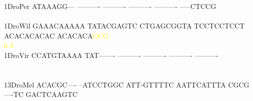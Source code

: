 \documentclass[11pt,twoside,reqno,a4paper]{article}
\begin{document}
{1\hspace*{3\charwidth}DroPer	ATAAAGG---	----------	----------	----------	----------	-----CTCCG	\\
\hspace*{4\charwidth}\hspace*{7\charwidth}\hspace*{1\charwidth}\hspace*{1\charwidth}\hspace*{1\charwidth}\hspace*{1\charwidth}\hspace*{1\charwidth}\hspace*{1\charwidth}\\
1\hspace*{3\charwidth}DroWil	GAAACAAAAA	TATACGAGTC	CTGAGCGGTA	TCCTCCTCCT	ACACACACAC	ACACACA\textcolor{Yellow}{G}\textcolor{Yellow}{C}\textcolor{Yellow}{G}	\\
\hspace*{4\charwidth}\hspace*{7\charwidth}\hspace*{1\charwidth}\hspace*{1\charwidth}\hspace*{1\charwidth}\hspace*{1\charwidth}\hspace*{1\charwidth}\hspace*{57\charwidth}\textcolor{Yellow}{6.3}\hspace*{1\charwidth}\\
1\hspace*{3\charwidth}DroVir	CCATGTAAAA	TAT-------	----------	----------	----------	----------	\\
\hspace*{4\charwidth}\hspace*{7\charwidth}\hspace*{1\charwidth}\hspace*{1\charwidth}\hspace*{1\charwidth}\hspace*{1\charwidth}\hspace*{1\charwidth}\hspace*{1\charwidth}\\
\\
13\hspace*{2\charwidth}DroMel	ACACGC----	--ATCCTGGC	ATT-GTTTTC	AATTCATTTA	CGCG----TC	GACTCAAGTC	\\
\hspace*{4\charwidth}\hspace*{7\charwidth}\hspace*{1\charwidth}\hspace*{1\charwidth}\hspace*{1\charwidth}\hspace*{1\charwidth}\hspace*{1\charwidth}\hspace*{1\charwidth}\\
}
\end{document}

